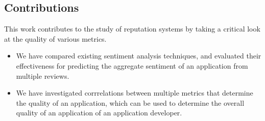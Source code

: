 \documentclass{acm_proc_article-sp}
\begin{document}
\subsection{Contributions}
This work contributes to the study of reputation systems by taking a critical look at the quality of various metrics.
\begin{itemize}
\item{We have compared existing sentiment analysis techniques, and evaluated their effectiveness for predicting the aggregate sentiment of an application from multiple reviews.}
\item{We have investigated corrrelations between multiple metrics that determine the quality of an application, which can be used to determine the overall quality of an application of an application developer.}
\end{itemize}



\balancecolumns
\end{document}
